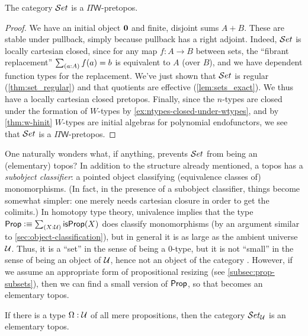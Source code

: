\begin{thm}
  The category $\mathcal{S}et$ is a $\Pi\mathsf{W}$-pretopos.
\end{thm}
\begin{proof}
  We have an initial object
  $\mathbf{0}$ and finite, disjoint sums $A+B$.  These are stable under pullback, simply because pullback has a right adjoint.  Indeed, $\mathcal{S}et$ is locally cartesian closed, since for any map $f:A\to B$ between sets, the ``fibrant replacement''  $\sm{a:A}f(a)=b$ is equivalent to $A$ (over $B$), and we have dependent function types for the replacement.
We've just shown that $\mathcal{S}et$ is regular (\cref{thm:set_regular}) and that quotients are effective (\cref{lem:sets_exact}). We thus have a locally cartesian closed pretopos. Finally, since the $n$-types are closed under the formation of $W$-types by \cref{ex:ntypes-closed-under-wtypes}, and by \cref{thm:w-hinit} $W$-types are initial algebras for polynomial endofunctors, we see that $\mathcal{S}et$ is a $\Pi\mathsf{W}$-pretopos.
\end{proof}


One naturally wonders what, if anything, prevents $\mathcal{S}et$ from being an (elementary) topos?
In addition to the structure already mentioned, a topos has a
\emph{subobject classifier}:
%
%
%
a pointed object classifying (equivalence classes of) monomorphisms.  (In fact, in the presence of a subobject
classifier, things become somewhat simpler: one merely needs cartesian closure in order to get the colimits.)
In homotopy type theory, univalence implies that the type $\prop \defeq \sm{X:\UU}\isprop(X)$ does classify monomorphisms (by an argument similar to \cref{sec:object-classification}), but in general it is as large as the ambient universe $\mathcal{U}$.
Thus, it is a ``set'' in the sense of being a $0$-type, but it is not ``small'' in the sense of being an object of $\mathcal{U}$, hence not an object of the category \uset.
However, if we assume an appropriate form of propositional resizing (see \cref{subsec:prop-subsets}), then we can find a small version of $\mathsf{Prop}$, so that \uset becomes an elementary topos.

\begin{thm}\label{thm:settopos}
  If there is a type $\Omega:\mathcal{U}$ of all mere propositions, then the category $\mathcal{S}et_\mathcal{U}$ is an elementary topos.
\end{thm}

